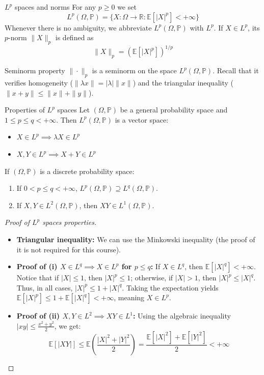 \documentclass[11pt, a4paper]{article}
\begin{document}
\begin{definition}{$L^p$ spaces and norms}{}
For any $p \ge 0$ we set
\[ L^p(\Omega, \mathbb{P}) = \{X : \Omega \to \mathbb{R} : \mathbb{E}[|X|^p] < +\infty\} \]
Whenever there is no ambiguity, we abbreviate $L^p(\Omega, \mathbb{P})$ with $L^p$. If $X \in L^p$, its $p$-norm $\|X\|_p$ is defined as
\[ \|X\|_p = (\mathbb{E}[|X|^p])^{1/p} \]
\end{definition}

\begin{theorem}{Seminorm property}{}
$\| \cdot \|_p$ is a seminorm on the space $L^p(\Omega, \mathbb{P})$. Recall that it verifies homogeneity ($\|\lambda x\| = |\lambda|\|x\|$) and the triangular inequality ($\|x + y\| \le \|x\| + \|y\|$).
\end{theorem}

\begin{proposition}{Properties of $L^p$ spaces}{}
Let $(\Omega, \mathbb{P})$ be a general probability space and $1 \le p \le q < +\infty$. Then $L^p(\Omega, \mathbb{P})$ is a vector space:
\begin{itemize}
    \item $X \in L^p \implies \lambda X \in L^p$
    \item $X, Y \in L^p \implies X + Y \in L^p$
\end{itemize}
If $(\Omega, \mathbb{P})$ is a discrete probability space:
\begin{enumerate}
    \item If $0 < p \le q < +\infty$, $L^p(\Omega, \mathbb{P}) \supseteq L^q(\Omega, \mathbb{P})$.
    \item If $X, Y \in L^2(\Omega, \mathbb{P})$, then $XY \in L^1(\Omega, \mathbb{P})$.
\end{enumerate}
\end{proposition}


\begin{proof}[Proof of $L^p$ spaces properties]
\begin{itemize}
    \item \textbf{Triangular inequality:} We can use the Minkowski inequality (the proof of it is not required for this course).
    \item \textbf{Proof of (i) $X \in L^q \implies X \in L^p$ for $p \le q$:} 
    If $X \in L^q$, then $\mathbb{E}[|X|^q] < +\infty$. Notice that if $|X| \le 1$, then $|X|^p \le 1$; otherwise, if $|X| > 1$, then $|X|^p \le |X|^q$. Thus, in all cases, $|X|^p \le 1 + |X|^q$. Taking the expectation yields $\mathbb{E}[|X|^p] \le 1 + \mathbb{E}[|X|^q] < +\infty$, meaning $X \in L^p$.
    \item \textbf{Proof of (ii) $X, Y \in L^2 \implies XY \in L^1$:} 
    Using the algebraic inequality $|xy| \le \frac{x^2 + y^2}{2}$, we get:
    \[ \mathbb{E}[|XY|] \le \mathbb{E}\left(\frac{|X|^2 + |Y|^2}{2}\right) = \frac{\mathbb{E}[|X|^2] + \mathbb{E}[|Y|^2]}{2} < +\infty \]
\end{itemize}
\end{proof}
\end{document}
